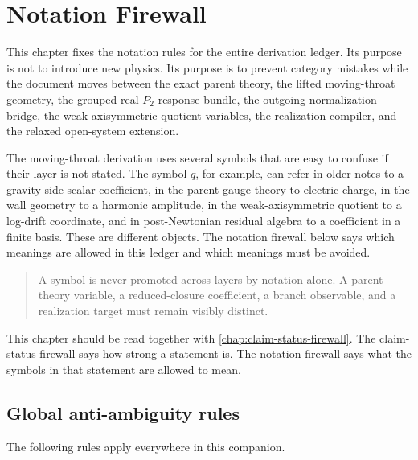 \chapter{Notation Firewall}
\label{chap:notation-firewall}

This chapter fixes the notation rules for the entire derivation ledger.  Its purpose is not to introduce new physics.  Its purpose is to prevent category mistakes while the document moves between the exact parent theory, the lifted moving-throat geometry, the grouped real \(P_2\) response bundle, the outgoing-normalization bridge, the weak-axisymmetric quotient variables, the realization compiler, and the relaxed open-system extension.

The moving-throat derivation uses several symbols that are easy to confuse if their layer is not stated.  The symbol \(q\), for example, can refer in older notes to a gravity-side scalar coefficient, in the parent gauge theory to electric charge, in the wall geometry to a harmonic amplitude, in the weak-axisymmetric quotient to a log-drift coordinate, and in post-Newtonian residual algebra to a coefficient in a finite basis.  These are different objects.  The notation firewall below says which meanings are allowed in this ledger and which meanings must be avoided.

\begin{quote}
A symbol is never promoted across layers by notation alone.  A parent-theory variable, a reduced-closure coefficient, a branch observable, and a realization target must remain visibly distinct.
\end{quote}

This chapter should be read together with \cref{chap:claim-status-firewall}.  The claim-status firewall says how strong a statement is.  The notation firewall says what the symbols in that statement are allowed to mean.

\section{Global anti-ambiguity rules}
\label{sec:notation-global-rules}

The following rules apply everywhere in this companion.

